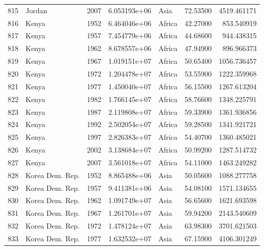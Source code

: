 \documentclass[
  letterpaper,
  DIV=11,
  numbers=noendperiod]{scrreprt}
\begin{document}
\begin{tabular}{llrrlrr}
815  &                    Jordan &  2007 &  6.053193e+06 &      Asia &  72.53500 &    4519.461171 \\
816  &                     Kenya &  1952 &  6.464046e+06 &    Africa &  42.27000 &     853.540919 \\
817  &                     Kenya &  1957 &  7.454779e+06 &    Africa &  44.68600 &     944.438315 \\
818  &                     Kenya &  1962 &  8.678557e+06 &    Africa &  47.94900 &     896.966373 \\
819  &                     Kenya &  1967 &  1.019151e+07 &    Africa &  50.65400 &    1056.736457 \\
820  &                     Kenya &  1972 &  1.204478e+07 &    Africa &  53.55900 &    1222.359968 \\
821  &                     Kenya &  1977 &  1.450040e+07 &    Africa &  56.15500 &    1267.613204 \\
822  &                     Kenya &  1982 &  1.766145e+07 &    Africa &  58.76600 &    1348.225791 \\
823  &                     Kenya &  1987 &  2.119808e+07 &    Africa &  59.33900 &    1361.936856 \\
824  &                     Kenya &  1992 &  2.502054e+07 &    Africa &  59.28500 &    1341.921721 \\
825  &                     Kenya &  1997 &  2.826383e+07 &    Africa &  54.40700 &    1360.485021 \\
826  &                     Kenya &  2002 &  3.138684e+07 &    Africa &  50.99200 &    1287.514732 \\
827  &                     Kenya &  2007 &  3.561018e+07 &    Africa &  54.11000 &    1463.249282 \\
828  &           Korea Dem. Rep. &  1952 &  8.865488e+06 &      Asia &  50.05600 &    1088.277758 \\
829  &           Korea Dem. Rep. &  1957 &  9.411381e+06 &      Asia &  54.08100 &    1571.134655 \\
830  &           Korea Dem. Rep. &  1962 &  1.091749e+07 &      Asia &  56.65600 &    1621.693598 \\
831  &           Korea Dem. Rep. &  1967 &  1.261701e+07 &      Asia &  59.94200 &    2143.540609 \\
832  &           Korea Dem. Rep. &  1972 &  1.478124e+07 &      Asia &  63.98300 &    3701.621503 \\
833  &           Korea Dem. Rep. &  1977 &  1.632532e+07 &      Asia &  67.15900 &    4106.301249 \\

\end{tabular}
\end{document}
